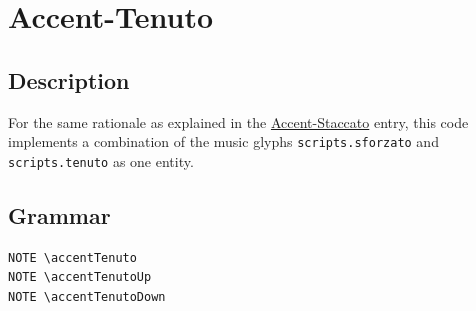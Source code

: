 

\section {Accent-Tenuto}
\hfill
{}
\hfill

\subsection{Description}
For the same rationale as explained in the \hyperref[sec:articulations_accent-staccato]{Accent-Staccato} entry, this code implements a combination of the music glyphs \verb|scripts.sforzato| and \verb|scripts.tenuto| as one entity.

\subsection{Grammar}
\begin{verbatim}
NOTE \accentTenuto
NOTE \accentTenutoUp
NOTE \accentTenutoDown
\end{verbatim}

